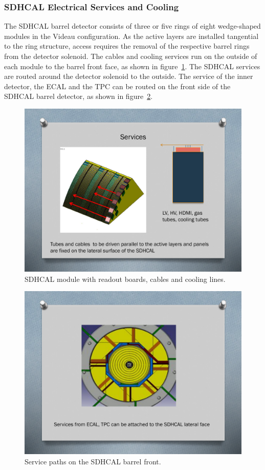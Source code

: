 \subsubsection{SDHCAL Electrical Services and Cooling}
The SDHCAL barrel detector consists of three or five rings of eight wedge-shaped modules in the Videau configuration. As the active layers are installed tangential to the ring structure, access requires the removal of the respective barrel rings from the detector solenoid. The cables and cooling services run on the outside of each module to the barrel front face, as shown in figure~\ref{ILD:fig:sdcal_module_services}. The SDHCAL services are routed around the detector solenoid to the outside. The service of the inner detector, the ECAL and the TPC can be routed on the front side of the SDHCAL barrel detector, as shown in figure~\ref{ILD:fig:sdhcal_barrel_services}.
\begin{figure}[h!]
    \centering
        \includegraphics[width=0.8\hsize]{Integration/fig/SDHCAL_Module_Services.pdf}
    \caption{SDHCAL module with readout boards, cables and cooling lines.}
    \label{ILD:fig:sdcal_module_services}
\end{figure}
\begin{figure}[h!]
    \centering
        \includegraphics[width=0.8\hsize]{Integration/fig/SDHCAL_Barrel_Services.pdf}
    \caption{Service paths on the SDHCAL barrel front.}
    \label{ILD:fig:sdhcal_barrel_services}
\end{figure}

